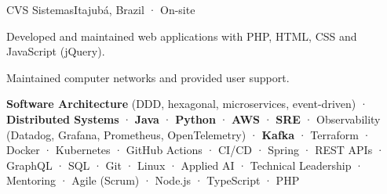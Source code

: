 \documentclass{resume}
\begin{document}
        {CVS Sistemas}{Itajubá, Brazil · On-site}
\begin{cvitems}
  \item Developed and maintained web applications with PHP, HTML, CSS and JavaScript (jQuery).
  \item Maintained computer networks and provided user support.
\end{cvitems}


\textbf{Software Architecture} (DDD, hexagonal, microservices, event-driven) ·
\textbf{Distributed Systems} · \textbf{Java} · \textbf{Python} · \textbf{AWS} ·
\textbf{SRE} · Observability (Datadog, Grafana, Prometheus, OpenTelemetry) · \textbf{Kafka} ·
Terraform · Docker · Kubernetes · GitHub Actions · CI/CD · Spring · REST APIs · GraphQL ·
SQL · Git · Linux · Applied AI · Technical Leadership · Mentoring · Agile (Scrum) ·
Node.js · TypeScript · PHP


\par
{}
\par
{}
\par


\end{document}
